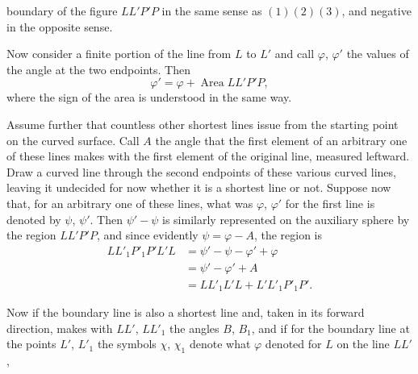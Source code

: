 %
boundary of the figure $LL'P'P$ in the same sense as $(1)(2)(3)$, and negative in the opposite sense.
\begin{center}
\hfill\hfill
\end{center}
\noindent\hspace*{1.2em}Now consider a finite portion of the line from $L$ to $L'$ and call $\varphi$, $\varphi'$ the values of the angle at the two endpoints. Then
\[
\varphi'=\varphi+\operatorname{Area}LL'P'P,
\]
where the sign of the area is understood in the same way.

Assume further that countless other shortest lines issue from the starting point on the curved surface. Call $A$ the angle that the first element of an arbitrary one of these lines makes with the first element of the original line, measured leftward. Draw a curved line through the second endpoints of these various curved lines, leaving it undecided for now whether it is a shortest line or not. Suppose now that, for an arbitrary one of these lines, what was $\varphi$, $\varphi'$ for the first line is denoted by $\psi$, $\psi'$. Then $\psi'-\psi$ is similarly represented on the auxiliary sphere by the region $LL'P'P$, and since evidently $\psi=\varphi-A$, the region is
\[
\begin{aligned}
LL'_1P'_1P'L'L&=\psi'-\psi-\varphi'+\varphi\\
&=\psi'-\varphi'+A\\
&=LL'_1L'L+L'L'_1P'_1P'.
\end{aligned}
\]
\begin{center}\end{center}
\noindent\hspace*{1.2em}Now if the boundary line is also a shortest line and, taken in its forward direction, makes with $LL'$, $LL'_1$ the angles $B$, $B_1$, and if for the boundary line at the points $L'$, $L'_1$ the symbols $\chi$, $\chi_1$ denote what $\varphi$ denoted for $L$ on the line $LL'$,
